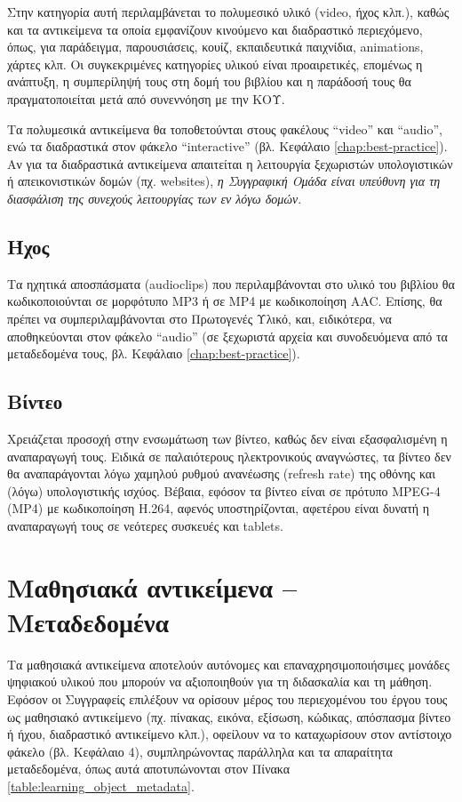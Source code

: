 Στην κατηγορία αυτή περιλαμβάνεται το πολυμεσικό υλικό (video, ήχος κλπ.), καθώς και
τα αντικείμενα τα οποία εμφανίζουν κινούμενο και διαδραστικό περιεχόμενο, όπως, για
παράδειγμα, παρουσιάσεις, κουίζ, εκπαιδευτικά παιχνίδια, animations, χάρτες κλπ. Οι
συγκεκριμένες κατηγορίες υλικού είναι προαιρετικές, επομένως η ανάπτυξη, η
συμπερίληψή τους στη δομή του βιβλίου και η παράδοσή τους θα πραγματοποιείται μετά
από συνεννόηση με την ΚΟΥ.

Τα πολυμεσικά αντικείμενα θα τοποθετούνται στους φακέλους “video” και “audio”, ενώ τα
διαδραστικά στον φάκελο “interactive” (βλ. Κεφάλαιο \ref{chap:best-practice}). Αν για τα διαδραστικά
αντικείμενα απαιτείται η λειτουργία ξεχωριστών υπολογιστικών ή απεικονιστικών δομών
(πχ. websites), \emph{η Συγγραφική Ομάδα είναι υπεύθυνη για τη διασφάλιση της συνεχούς
λειτουργίας των εν λόγω δομών}.

\subsection{Ήχος}
Τα ηχητικά αποσπάσματα (audioclips) που περιλαμβάνονται στο υλικό του βιβλίου θα
κωδικοποιούνται σε μορφότυπο MP3 ή σε MP4 με κωδικοποίηση AAC. Επίσης, θα
πρέπει να συμπεριλαμβάνονται στο Πρωτογενές Υλικό, και, ειδικότερα, να αποθηκεύονται
στον φάκελο “audio” (σε ξεχωριστά αρχεία και συνοδευόμενα από τα μεταδεδομένα τους,
βλ. Κεφάλαιο \ref{chap:best-practice}).

\subsection{Βίντεο}

Χρειάζεται προσοχή στην ενσωμάτωση των βίντεο, καθώς δεν είναι εξασφαλισμένη η
αναπαραγωγή τους. Ειδικά σε παλαιότερους ηλεκτρονικούς αναγνώστες, τα βίντεο δεν θα
αναπαράγονται λόγω χαμηλού ρυθμού ανανέωσης (refresh rate) της οθόνης και (λόγω)
υπολογιστικής ισχύος. Βέβαια, εφόσον τα βίντεο είναι σε πρότυπο MPEG-4 (MP4) με
κωδικοποίηση H.264, αφενός υποστηρίζονται, αφετέρου είναι δυνατή η αναπαραγωγή
τους σε νεότερες συσκευές και tablets.

\section{Μαθησιακά αντικείμενα – Μεταδεδομένα}\label{par:metadata}

Τα μαθησιακά αντικείμενα αποτελούν αυτόνομες και επαναχρησιμοποιήσιμες μονάδες
ψηφιακού υλικού που μπορούν να αξιοποιηθούν για τη διδασκαλία και τη μάθηση. Εφόσον
οι Συγγραφείς επιλέξουν να ορίσουν μέρος του περιεχομένου του έργου τους ως μαθησιακό
αντικείμενο (πχ. πίνακας, εικόνα, εξίσωση, κώδικας, απόσπασμα βίντεο ή ήχου, διαδραστικό
αντικείμενο κλπ.), οφείλουν να το καταχωρίσουν στον αντίστοιχο φάκελο (βλ. Κεφάλαιο
4), συμπληρώνοντας παράλληλα και τα απαραίτητα μεταδεδομένα, όπως αυτά
αποτυπώνονται στον Πίνακα \ref{table:learning_object_metadata}.

